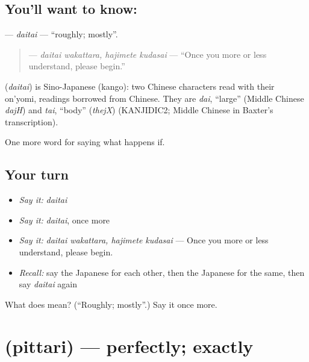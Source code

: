 \subsection*{You'll want to know: }
\textbf{} — \emph{daitai} — \textquotedblleft{}roughly; mostly\textquotedblright{}.

\begin{quote}
\textbf{  } — \emph{daitai wakattara, hajimete kudasai} — \textquotedblleft{}Once you more or less understand, please begin.\textquotedblright{}
\end{quote}

\begin{cousinweb}
\textbf{} (\emph{daitai}) is Sino-Japanese (kango): two Chinese characters read with their on'yomi, readings borrowed from Chinese. They are \emph{dai}, \textquotedblleft{}large\textquotedblright{} (Middle Chinese \emph{dajH}) and \emph{tai}, \textquotedblleft{}body\textquotedblright{} (\emph{thejX}) (KANJIDIC2; Middle Chinese in Baxter's transcription).
\end{cousinweb}

\begin{grammarlens}[title={What you've built}]
One more word for saying what happens if.
\end{grammarlens}

\subsection*{Your turn}
\begin{itemize}
\raggedright
  \item \emph{Say it:} \emph{daitai}
  \item \emph{Say it:} \emph{daitai}, once more
  \item \emph{Say it:} \emph{daitai wakattara, hajimete kudasai} — Once you more or less understand, please begin.
  \item \emph{Recall:} say the Japanese for each other, then the Japanese for the same, then say \emph{daitai} again
\end{itemize}

\begin{tcolorbox}[breakable,colback=teal!4,colframe=teal!35!black,title={Before you move on}]
What does  mean? (\textquotedblleft{}Roughly; mostly\textquotedblright{}.) Say it once more.
\end{tcolorbox}
\section[\texorpdfstring{\ja{ぴったり} (pittari)}{ぴったり (pittari)}]{ (pittari) — perfectly; exactly}

